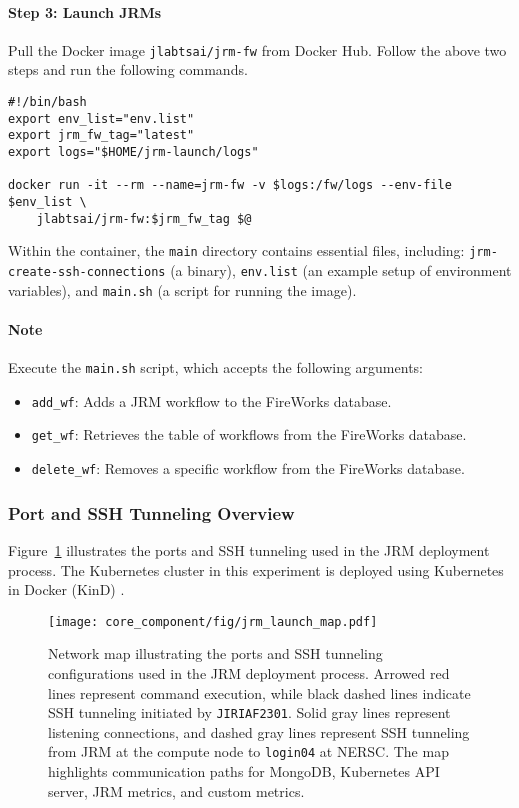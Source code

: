 \paragraph{Step 3: Launch JRMs}
Pull the Docker image \texttt{jlabtsai/jrm-fw} from Docker Hub. Follow the above two steps and run the following commands.

\begin{verbatim}
#!/bin/bash
export env_list="env.list"
export jrm_fw_tag="latest"
export logs="$HOME/jrm-launch/logs"

docker run -it --rm --name=jrm-fw -v $logs:/fw/logs --env-file $env_list \
    jlabtsai/jrm-fw:$jrm_fw_tag $@
\end{verbatim}

Within the container, the \texttt{main} directory contains essential files, including:
\texttt{jrm-create-ssh-connections} (a binary), 
\texttt{env.list} (an example setup of environment variables), 
and \texttt{main.sh} (a script for running the image).

\paragraph{Note}
Execute the \texttt{main.sh} script, which accepts the following arguments:
\begin{itemize}
    \item \texttt{add\_wf}: Adds a JRM workflow to the FireWorks database.
    \item \texttt{get\_wf}: Retrieves the table of workflows from the FireWorks database.
    \item \texttt{delete\_wf}: Removes a specific workflow from the FireWorks database.
\end{itemize}

\subsubsection{Port and SSH Tunneling Overview}

Figure~\ref{fig:network_map} illustrates the ports and SSH tunneling used in the JRM deployment process. The Kubernetes cluster in this experiment is deployed using Kubernetes in Docker (KinD) \cite{KinD}.

\begin{figure}[htbp]
\centering
\texttt{[image: core\_component/fig/jrm\_launch\_map.pdf]}
\caption{
Network map illustrating the ports and SSH tunneling configurations used in the JRM deployment process. Arrowed red lines represent command execution, while black dashed lines indicate SSH tunneling initiated by \texttt{JIRIAF2301}. Solid gray lines represent listening connections, and dashed gray lines represent SSH tunneling from JRM at the compute node to \texttt{login04} at NERSC. The map highlights communication paths for MongoDB, Kubernetes API server, JRM metrics, and custom metrics.
}
\label{fig:network_map}
\end{figure}


